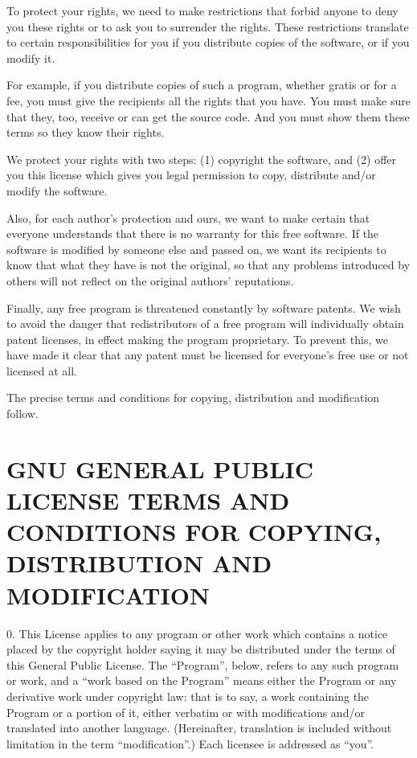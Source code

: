   To protect your rights, we need to make restrictions that forbid
anyone to deny you these rights or to ask you to surrender the rights.
These restrictions translate to certain responsibilities for you if you
distribute copies of the software, or if you modify it.

  For example, if you distribute copies of such a program, whether
gratis or for a fee, you must give the recipients all the rights that
you have.  You must make sure that they, too, receive or can get the
source code.  And you must show them these terms so they know their
rights.

  We protect your rights with two steps: (1) copyright the software, and
(2) offer you this license which gives you legal permission to copy,
distribute and/or modify the software.

  Also, for each author's protection and ours, we want to make certain
that everyone understands that there is no warranty for this free
software.  If the software is modified by someone else and passed on, we
want its recipients to know that what they have is not the original, so
that any problems introduced by others will not reflect on the original
authors' reputations.

  Finally, any free program is threatened constantly by software
patents.  We wish to avoid the danger that redistributors of a free
program will individually obtain patent licenses, in effect making the
program proprietary.  To prevent this, we have made it clear that any
patent must be licensed for everyone's free use or not licensed at all.

  The precise terms and conditions for copying, distribution and
modification follow.

\section*{GNU GENERAL PUBLIC LICENSE
  TERMS AND CONDITIONS FOR COPYING, DISTRIBUTION AND MODIFICATION}

  0. This License applies to any program or other work which contains
a notice placed by the copyright holder saying it may be distributed
under the terms of this General Public License.  The ``Program'', below,
refers to any such program or work, and a ``work based on the Program''
means either the Program or any derivative work under copyright law:
that is to say, a work containing the Program or a portion of it,
either verbatim or with modifications and/or translated into another
language.  (Hereinafter, translation is included without limitation in
the term ``modification''.)  Each licensee is addressed as ``you''.

